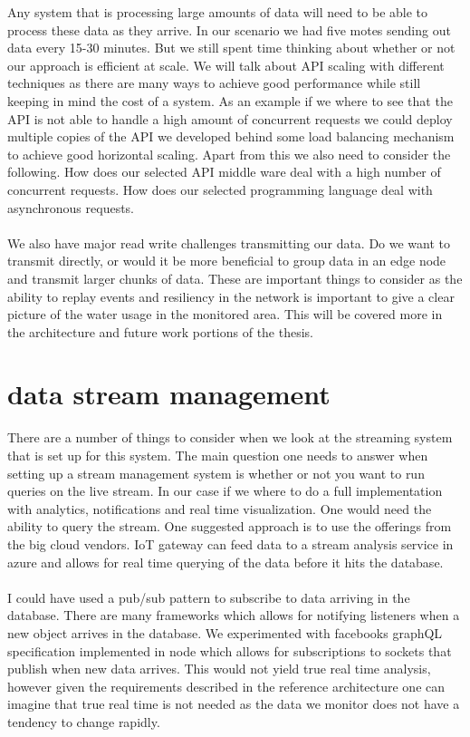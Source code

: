 \documentclass[]{uiophd}
\begin{document}
Any system that is processing large amounts of data will need to be able to process these data as they arrive. In our scenario we had five motes sending out data every 15-30 minutes. But we still spent time thinking about whether or not our approach is efficient at scale. We will talk about API scaling with different techniques as there are many ways to achieve good performance while still keeping in mind the cost of a system. As an example if we where to see that the API is not able to handle a high amount of concurrent requests we could deploy multiple copies of the API we developed behind some load balancing mechanism to achieve good horizontal scaling. Apart from this we also need to consider the following. How does our selected API middle ware deal with a high number of concurrent requests. How does our selected programming language deal with asynchronous requests.
\\\\
We also have major read write challenges transmitting our data. Do we want to transmit directly, or would it be more beneficial to group data in an edge node and transmit larger chunks of data. These are important things to consider as the ability to replay events and resiliency in the network is important to give a clear picture of the water usage in the monitored area. This will be covered more in the architecture and future work portions of the thesis.

\section{data stream management}
There are a number of things to consider when we look at the streaming system that is set up for this system. The main question one needs to answer when setting up a stream management system is whether or not you want to run queries on the live stream. In our case if we where to do a full implementation with analytics, notifications and real time visualization. One would need the ability to query the stream. One suggested approach is to use the offerings from the big cloud vendors. IoT gateway can feed data to a stream analysis service in azure and allows for real time querying of the data before it hits the database.
\\\\
I could have used a pub/sub pattern to subscribe to data arriving in the database. There are many frameworks which allows for notifying listeners when a new object arrives in the database. We experimented with facebooks graphQL specification implemented in node which allows for subscriptions to sockets that publish when new data arrives. This would not yield true real time analysis, however given the requirements described in the reference architecture one can imagine that true real time is not needed as the data we monitor does not have a tendency to change rapidly.
\end{document}
